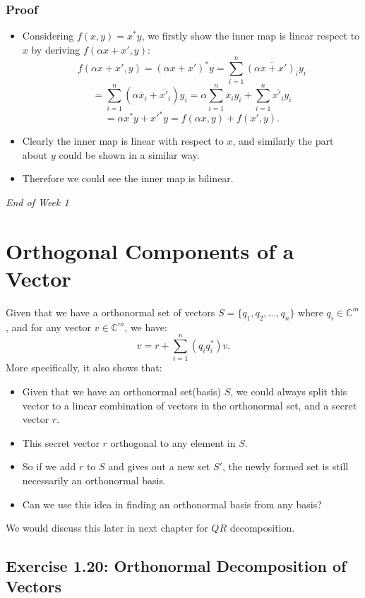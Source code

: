 \subsubsection*{Proof}%
\begin{itemize}
  \item Considering $f(x, y) = x^{*}y$, we firstly show the inner map is linear respect to $x$ by deriving $f(\alpha x + x', y)$:
    \[
    f(\alpha x + x', y) = (\alpha x + x')^{*}y = \sum_{i=1}^{n} \overline{(\alpha x + x')_i}y_i
    \]
    \[
      = \sum_{i=1}^{n} (\alpha \overline{x}_i + \overline{x'}_i)y_i = \alpha \sum_{i=1}^{n} \overline{x}_{i} y_i + \sum_{i=1}^{n} \overline{x'_i} y_i
    \]
    \[
      = \alpha x^{*}y + x'^{*}y = f(\alpha x, y) + f(x', y)
    .\] 
  \item Clearly the inner map is linear with respect to  $x$, and similarly the part about $y$ could be shown in a similar way.
  \item Therefore we could see the inner map is bilinear.
\end{itemize}

\bigskip

\begin{center}
  \textit{\large End of Week 1}
\end{center}
\newpage
\section{Orthogonal Components of a Vector}%
Given that we have a orthonormal set of vectors $S = \{q_1, q_2, \ldots, q_n\} $ where $q_i \in \mathbb{C}^{m}$, and for any vector $v \in \mathbb{C}^{m}$, we have:
\[
  v = r + \sum_{i=1}^{n} (q_iq_i^{*})v
.\] 
More specifically, it also shows that:
\begin{itemize}
  \item Given that we have an orthonormal set(basis) $S$, we could always split this vector to a linear combination of vectors in the orthonormal set, and a secret vector $r$. 
  \item This secret vector $r$ orthogonal to any element in $S$.
  \item So if we add $r$ to $S$ and gives out a new set $S'$, the newly formed set is still necessarily an orthonormal basis.
  \item Can we use this idea in finding an orthonormal basis from any basis?
\end{itemize}
We would discuss this later in next chapter for $QR$ decomposition.
\subsection*{Exercise 1.20: Orthonormal Decomposition of Vectors}
